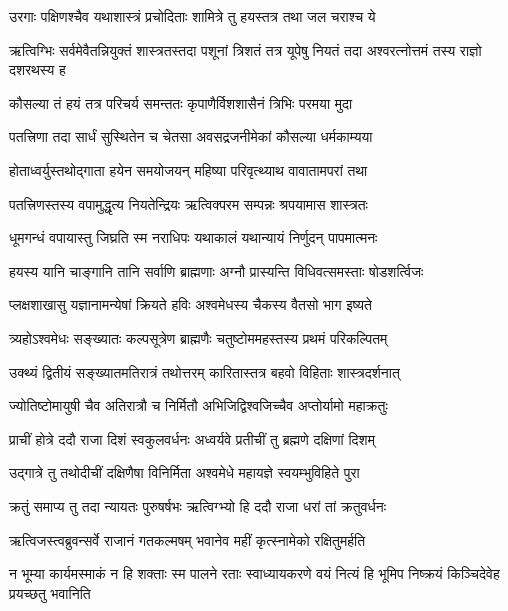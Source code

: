 \twolineshloka
{उरगाः पक्षिणश्चैव यथाशास्त्रं प्रचोदिताः}
{शामित्रे तु हयस्तत्र तथा जल चराश्च ये} %

\threelineshloka
{ऋत्विग्भिः सर्वमेवैतन्नियुक्तं शास्त्रतस्तदा}
{पशूनां त्रिशतं तत्र यूपेषु नियतं तदा}
{अश्वरत्नोत्तमं तस्य राज्ञो दशरथस्य ह} %

\twolineshloka
{कौसल्या तं हयं तत्र परिचर्य समन्ततः}
{कृपाणैर्विशशासैनं त्रिभिः परमया मुदा} %

\twolineshloka
{पतत्त्रिणा तदा सार्धं सुस्थितेन च चेतसा}
{अवसद्रजनीमेकां कौसल्या धर्मकाम्यया} %

\twolineshloka
{होताध्वर्युस्तथोद्गाता हयेन समयोजयन्}
{महिष्या परिवृत्थ्याथ वावातामपरां तथा} %

\twolineshloka
{पतत्त्रिणस्तस्य वपामुद्धृत्य नियतेन्द्रियः}
{ऋत्विक्परम सम्पन्नः श्रपयामास शास्त्रतः} %

\twolineshloka
{धूमगन्धं वपायास्तु जिघ्रति स्म नराधिपः}
{यथाकालं यथान्यायं निर्णुदन् पापमात्मनः} %

\twolineshloka
{हयस्य यानि चाङ्गानि तानि सर्वाणि ब्राह्मणाः}
{अग्नौ प्रास्यन्ति विधिवत्समस्ताः षोडशर्त्विजः} %

\twolineshloka
{प्लक्षशाखासु यज्ञानामन्येषां क्रियते हविः}
{अश्वमेधस्य चैकस्य वैतसो भाग इष्यते} %

\twolineshloka
{त्र्यहोऽश्वमेधः सङ्ख्यातः कल्पसूत्रेण ब्राह्मणैः}
{चतुष्टोममहस्तस्य प्रथमं परिकल्पितम्} %

\twolineshloka
{उक्थ्यं द्वितीयं सङ्ख्यातमतिरात्रं तथोत्तरम्}
{कारितास्तत्र बहवो विहिताः शास्त्रदर्शनात्} %

\twolineshloka
{ज्योतिष्टोमायुषी चैव अतिरात्रौ च निर्मितौ}
{अभिजिद्विश्वजिच्चैव अप्तोर्यामो महाक्रतुः} %

\twolineshloka
{प्राचीं होत्रे ददौ राजा दिशं स्वकुलवर्धनः}
{अध्वर्यवे प्रतीचीं तु ब्रह्मणे दक्षिणां दिशम्} %

\twolineshloka
{उद्गात्रे तु तथोदीचीं दक्षिणैषा विनिर्मिता}
{अश्वमेधे महायज्ञे स्वयम्भुविहिते पुरा} %

\twolineshloka
{क्रतुं समाप्य तु तदा न्यायतः पुरुषर्षभः}
{ऋत्विग्भ्यो हि ददौ राजा धरां तां क्रतुवर्धनः} %

\twolineshloka
{ऋत्विजस्त्वब्रुवन्सर्वे राजानं गतकल्मषम्}
{भवानेव महीं कृत्स्नामेको रक्षितुमर्हति} %

\threelineshloka
{न भूम्या कार्यमस्माकं न हि शक्ताः स्म पालने}
{रताः स्वाध्यायकरणे वयं नित्यं हि भूमिप}
{निष्क्रयं किञ्चिदेवेह प्रयच्छतु भवानिति} %

